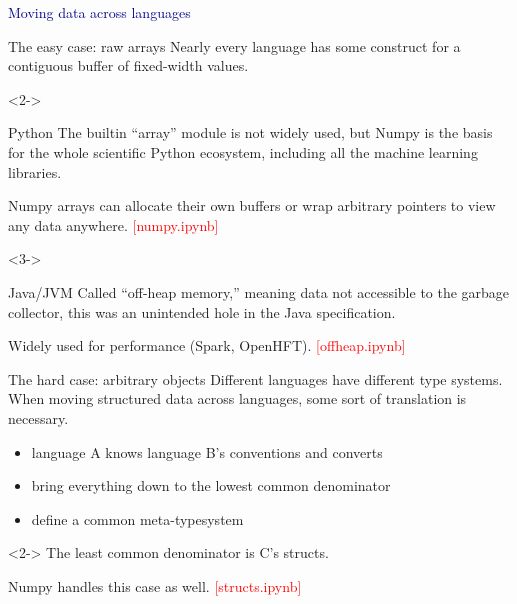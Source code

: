 \documentclass{beamer}
\begin{document}
\begin{frame}{}
\begin{center}
\textcolor{darkblue}{\LARGE Moving data across languages}
\end{center}
\end{frame}

\begin{frame}{The easy case: raw arrays}
\vspace{0.5 cm}
Nearly every language has some construct for a contiguous buffer of fixed-width values.

\vspace{0.25 cm}
\begin{uncoverenv}<2->
\begin{block}{Python}
The builtin ``array'' module is not widely used, but Numpy is the basis for the whole scientific Python ecosystem, including all the machine learning libraries.

\vspace{0.25 cm}
Numpy arrays can allocate their own buffers or wrap arbitrary pointers to view any data anywhere. \hfill \textcolor{red}{[numpy.ipynb]}
\end{block}
\end{uncoverenv}

\vspace{0.25 cm}
\begin{uncoverenv}<3->
\begin{block}{Java/JVM}
Called ``off-heap memory,'' meaning data not accessible to the garbage collector, this was an unintended hole in the Java specification.

\vspace{0.25 cm}
Widely used for performance (Spark, OpenHFT). \hfill \textcolor{red}{[offheap.ipynb]}
\end{block}
\end{uncoverenv}
\end{frame}

\begin{frame}{The hard case: arbitrary objects}
Different languages have different type systems. When moving structured data across languages, some sort of translation is necessary.
\begin{itemize}
\item language A knows language B's conventions and converts
\item bring everything down to the lowest common denominator
\item define a common meta-typesystem
\end{itemize}

\vspace{0.25 cm}
\begin{uncoverenv}<2->
The least common denominator is C's structs.

\vspace{0.5 cm}
Numpy handles this case as well. \hfill \textcolor{red}{[structs.ipynb]}
\end{uncoverenv}
\end{frame}
\end{document}
